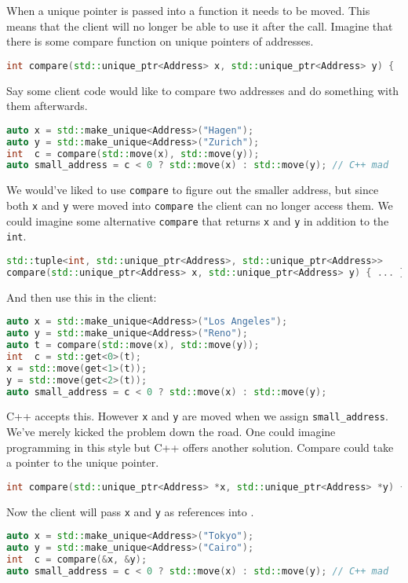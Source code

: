 \documentclass{article}
\begin{document}
\begin{example}
  When a unique pointer is passed into a function it needs to be moved.
  This means that the client will no longer be able to use it after the call.
  Imagine that there is some compare function on unique pointers of addresses.
\begin{lstlisting}[escapechar=|, language=C++]
int compare(std::unique_ptr<Address> x, std::unique_ptr<Address> y) { ... }
\end{lstlisting}
  Say some client code would like to compare two addresses and do something with them afterwards.
\begin{lstlisting}[escapechar=|, language=C++]
auto x = std::make_unique<Address>("Hagen");
auto y = std::make_unique<Address>("Zurich");
int  c = compare(std::move(x), std::move(y));
auto small_address = c < 0 ? std::move(x) : std::move(y); // C++ mad
\end{lstlisting}
  We would've liked to use \texttt{compare} to figure out the smaller address, but since both \texttt{x} and \texttt{y} were moved into \texttt{compare} the client can no longer access them.
  We could imagine some alternative \texttt{compare} that returns \texttt{x} and \texttt{y} in addition to the \texttt{int}.
\begin{lstlisting}[escapechar=|, language=C++]
std::tuple<int, std::unique_ptr<Address>, std::unique_ptr<Address>>
compare(std::unique_ptr<Address> x, std::unique_ptr<Address> y) { ... }
\end{lstlisting}
  And then use this in the client:
\begin{lstlisting}[escapechar=|, language=C++]
auto x = std::make_unique<Address>("Los Angeles");
auto y = std::make_unique<Address>("Reno");
auto t = compare(std::move(x), std::move(y));
int  c = std::get<0>(t);
x = std::move(get<1>(t));
y = std::move(get<2>(t));
auto small_address = c < 0 ? std::move(x) : std::move(y);
\end{lstlisting}
  C++ accepts this.
  However \texttt{x} and \texttt{y} are moved when we assign \texttt{small\_address}.
  We've merely kicked the problem down the road.
  One could imagine programming in this style but C++ offers another solution.
  Compare could take a pointer to the unique pointer.
  \begin{lstlisting}[escapechar=|, language=C++]
int compare(std::unique_ptr<Address> *x, std::unique_ptr<Address> *y) { ... }
\end{lstlisting}
  Now the client will pass \texttt{x} and \texttt{y} as references into .
\begin{lstlisting}[escapechar=|, language=C++]
auto x = std::make_unique<Address>("Tokyo");
auto y = std::make_unique<Address>("Cairo");
int  c = compare(&x, &y);
auto small_address = c < 0 ? std::move(x) : std::move(y); // C++ mad
\end{lstlisting}
\end{example}
\end{document}
